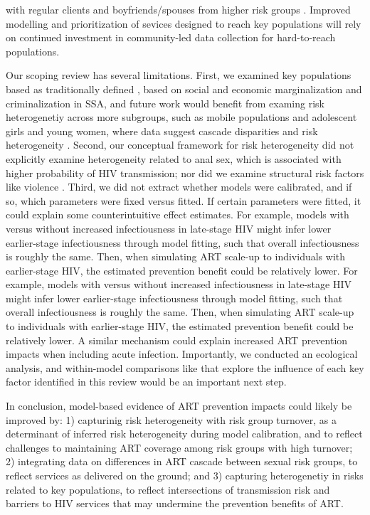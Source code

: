with regular clients and boyfriends/spouses from higher risk groups \cite{Scorgie2012}.
Improved modelling and prioritization of sevices designed to reach key populations
will rely on continued investment in community-led data collection for hard-to-reach populations.
\par
Our scoping review has several limitations.
First, we examined key populations based as traditionally defined \cite{WHO2016kp},
based on social and economic marginalization and criminalization in SSA,
and future work would benefit from examing risk heterogenetiy across more subgroups,
such as mobile populations and adolescent girls and young women,
where data suggest cascade disparities and risk heterogeneity \cite{Tanser2015,Dellar2015}.
Second, our conceptual framework for risk heterogeneity did not explicitly examine
heterogeneity related to anal sex, which is associated with higher probability of HIV transmission;
nor did we examine structural risk factors like violence \cite{Silverman2011,Baggaley2013}.
Third, we did not extract whether models were calibrated,
and if so, which parameters were fixed versus fitted.
If certain parameters were fitted, it could explain some counterintuitive effect estimates.
For example, models with versus without increased infectiousness in late-stage HIV
might infer lower earlier-stage infectiousness through model fitting,
such that overall infectiousness is roughly the same.
Then, when simulating ART scale-up to individuals with earlier-stage HIV,
the estimated prevention benefit could be relatively lower.
For example, models with versus without increased infectiousness in late-stage HIV
might infer lower earlier-stage infectiousness through model fitting,
such that overall infectiousness is roughly the same.
Then, when simulating ART scale-up to individuals with earlier-stage HIV,
the estimated prevention benefit could be relatively lower.
A similar mechanism could explain increased ART prevention impacts when including acute infection.
Importantly, we conducted an ecological analysis,
and within-model comparisons like \cite{Dodd2010,Hontelez2013} that explore
the influence of each key factor identified in this review would be an important next step.
\par
In conclusion, model-based evidence of ART prevention impacts could likely be improved by:
1) capturinig risk heterogeneity with risk group turnover,
   as a determinant of inferred risk heterogeneity during model calibration, and
   to reflect challenges to maintaining ART coverage among risk groups with high turnover;
2) integrating data on differences in ART cascade between sexual risk groups,
   to reflect services as delivered on the ground; and
3) capturing heterogenetiy in risks related to key populations,
   to reflect intersections of transmission risk and barriers to HIV services
   that may undermine the prevention benefits of ART.
